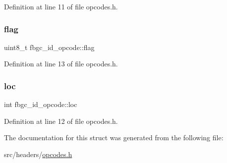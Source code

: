 Definition at line 11 of file opcodes.\+h.

\mbox{\label{structfbgc__id__opcode_a9e94ad23e577f45553e7b36b63801d13}} 
\subsubsection{\texorpdfstring{flag}{flag}}
{\footnotesize\ttfamily uint8\+\_\+t fbgc\+\_\+id\+\_\+opcode\+::flag}



Definition at line 13 of file opcodes.\+h.

\mbox{\label{structfbgc__id__opcode_aea7f1dc6776a5a16ce99ff1fb58f9681}} 
\subsubsection{\texorpdfstring{loc}{loc}}
{\footnotesize\ttfamily int fbgc\+\_\+id\+\_\+opcode\+::loc}



Definition at line 12 of file opcodes.\+h.



The documentation for this struct was generated from the following file\+:\begin{DoxyCompactItemize}
\item 
src/headers/\hyperlink{opcodes_8h}{opcodes.\+h}\end{DoxyCompactItemize}
